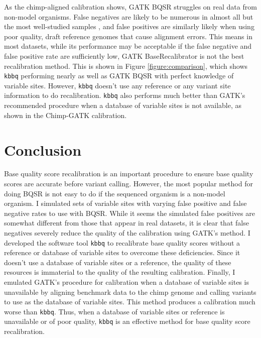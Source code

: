 As the chimp-aligned calibration shows, GATK BQSR struggles on real data from non-model organisms. False negatives are likely to be numerous in almost all but the most well-studied samples \parencite{bobo_false_2016}, and false positives are similarly likely when using poor quality, draft reference genomes that cause alignment errors. This means in most datasets, while its performance may be acceptable if the false negative and false positive rate are sufficiently low, GATK BaseRecalibrator is not the best recalibration method. This is shown in Figure \ref{figure:comparison}, which shows \texttt{kbbq} performing nearly as well as GATK BQSR with perfect knowledge of variable sites. However, \texttt{kbbq} doesn't use any reference or any variant site information to do recalibration. \texttt{kbbq} also performs much better than GATK's recommended procedure when a database of variable sites is not available, as shown in the Chimp-GATK calibration.

\section{Conclusion}

Base quality score recalibration is an important procedure to ensure base quality scores are accurate before variant calling. However, the most popular method for doing BQSR is not easy to do if the sequenced organism is a non-model organism. I simulated sets of variable sites with varying false positive and false negative rates to use with BQSR. While it seems the simulated false positives are somewhat different from those that appear in real datasets, it is clear that false negatives severely reduce the quality of the calibration using GATK's method. I developed the software tool \texttt{kbbq} to recalibrate base quality scores without a reference or database of variable sites to overcome these deficiencies. Since it doesn't use a database of variable sites or a reference, the quality of these resources is immaterial to the quality of the resulting calibration. Finally, I emulated GATK's procedure for calibration when a database of variable sites is unavailable by aligning benchmark data to the chimp genome and calling variants to use as the database of variable sites. This method produces a calibration much worse than \texttt{kbbq}. Thus, when a database of variable sites or reference is unavailable or of poor quality, \texttt{kbbq} is an effective method for base quality score recalibration.

\printbibliography[segment=\therefsegment]{}

